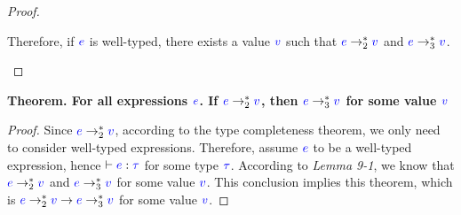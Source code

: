 \documentclass{article}
\newcommand{\meta}[1]{{\color{blue}#1}}
\begin{document}
\begin{enumerate}[leftmargin=*,itemindent=*,start=6,label={{\bf Problem \arabic*}.},ref=\arabic*]
\begin{enumerate}[(a)]
\begin{proof}
\begin{enumerate}
\begin{itemize}
\begin{enumerate}
                \end{enumerate}
          \end{itemize}
          Therefore, if $\meta{e}$ is well-typed, there exists a value $\meta{v}$ such that $\meta{e} \to_2^* \meta{v}$ and $\meta{e} \to_3^* \meta{v}$.
      \end{enumerate}
    \end{proof}

    \textbf{
      Theorem. For all expressions $\meta{e}$. If $\meta{e} \to_2^* \meta{v}$, then $\meta{e} \to_3^* \meta{v}$ for some value $\meta{v}$
    }
    \begin{proof}
      Since $\meta{e} \to_2^* \meta{v}$, according to the type completeness theorem, we only need to consider well-typed expressions. Therefore, assume $\meta{e}$ to be a well-typed expression, hence $\vdash \meta{e} : \meta{\tau}$ for some type $\meta{\tau}$. According to \textit{Lemma 9-1}, we know that $\meta{e} \to_2^* \meta{v}$ and $\meta{e} \to_3^* \meta{v}$ for some value $\meta{v}$. This conclusion implies this theorem, which is $\meta{e}\to_2^* \meta{v} \to \meta{e}\to_3^* \meta{v}$ for some value $\meta{v}$.

\end{proof}
\end{enumerate}
\end{enumerate}
\end{document}
